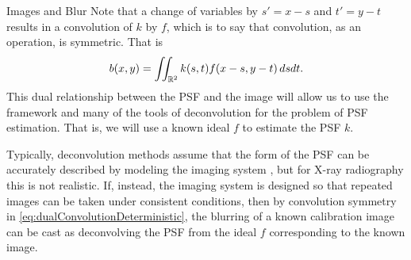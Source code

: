 \begin{chapter}{Images and Blur}
  Note that a change of variables by $s'=x-s$ and $t'=y-t$ results in a convolution of $k$ by $f$, which is to say that convolution, as an operation, is symmetric.
  That is
\begin{equation}\label{eq:dualConvolutionDeterministic}
  b(x,y) = \iint_{\mathbb R^2} k(s,t) f(x-s,y-t)\,dsdt.
\end{equation}
  This dual relationship between the PSF and the image will allow us to use the framework and many of the tools of deconvolution for the problem of PSF estimation.
  That is, we will use a known ideal $f$ to estimate the PSF $k$.

  Typically, deconvolution methods assume that the form of the PSF can be accurately described by modeling the imaging system \citep{jain1989,hansen2010}, but for X-ray radiography this is not realistic.
  If, instead, the imaging system is designed so that repeated images can be taken under consistent conditions, then by convolution symmetry in \eqref{eq:dualConvolutionDeterministic}, the blurring of a known calibration image can be cast as deconvolving the PSF from the ideal $f$ corresponding to the known image.


\end{chapter}
